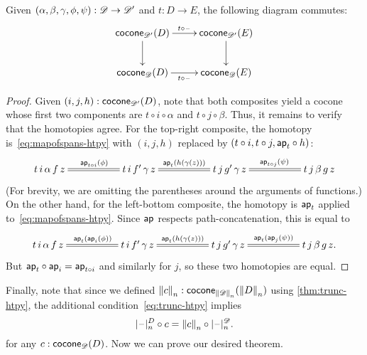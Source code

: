 \begin{lem}\label{thm:conemap-funct}
  Given $(\alpha,\beta,\gamma,\phi,\psi):\Ddiag \to \Ddiag'$ and $t:D\to E$, the following diagram commutes:
  \begin{equation*}
    \vcenter{\xymatrix{
        \cocone{\Ddiag'}{D}\ar[r]^{t \circ {\blank}}\ar[d] &
        \cocone{\Ddiag'}{E}\ar[d]\\
        \cocone{\Ddiag}{D}\ar[r]_{t \circ {\blank}} &
        \cocone{\Ddiag}{E}
      }}
  \end{equation*}
\end{lem}
\begin{proof}
  Given $(i,j,h):\cocone{\Ddiag'}{D}$, note that both composites yield a cocone whose first two components are $t\circ i\circ \alpha$ and $t\circ j\circ\beta$.
  Thus, it remains to verify that the homotopies agree.
  For the top-right composite, the homotopy is~\eqref{eq:mapofspans-htpy} with $(i,j,h)$ replaced by $(t\circ i, t\circ j, \apfunc{t}\circ h)$:
  \begin{equation*}
    \xymatrix@+2.8em{
      {t \, i \, \alpha \, f \, z} \ar@{=}[r]^{\apfunc{t\circ i}(\phi)} &
      {t \, i \, f' \, \gamma \, z} \ar@{=}[r]^{\apfunc{t}(h(\gamma(z)))} &
      {t \, j \, g' \, \gamma \, z} \ar@{=}[r]^{\apfunc{t\circ j}(\psi)} &
      {t \, j \, \beta \, g \, z}
    }
  \end{equation*}
  (For brevity, we are omitting the parentheses around the arguments of functions.)
  On the other hand, for the left-bottom composite, the homotopy is $\apfunc{t}$ applied to~\eqref{eq:mapofspans-htpy}.
  Since $\apfunc{}$ respects path-concatenation, this is equal to
  \begin{equation*}
    \xymatrix@+2.8em{
      {t \, i \, \alpha \, f \, z} \ar@{=}[r]^{\apfunc{t}(\apfunc{i}(\phi))} &
      {t \, i \, f' \, \gamma \, z} \ar@{=}[r]^{\apfunc{t}(h(\gamma(z)))} &
      {t \, j \, g' \, \gamma \, z} \ar@{=}[r]^{\apfunc{t}(\apfunc{j}(\psi))} &
      {t \, j \, \beta \, g \, z}. }
  \end{equation*}
  But $\apfunc{t}\circ \apfunc{i} = \apfunc{t\circ i}$ and similarly for $j$, so these two homotopies are equal.
\end{proof}

Finally, note that since we defined $\trunc nc : \cocone{\trunc n \Ddiag}{\trunc n D}$ using \autoref{thm:trunc-htpy}, the additional condition~\eqref{eq:trunc-htpy} implies
\begin{equation}
  \tprojf[D] n \circ c = \trunc n c \circ \tprojf[\Ddiag]n .\label{eq:conetrunc}
\end{equation}
for any $c:\cocone{\Ddiag}{D}$.
Now we can prove our desired theorem.


